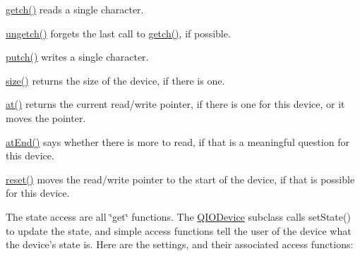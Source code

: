 \begin{DoxyItemize}
\item \hyperlink{class_q_i_o_device_a8fcd2eaee3ba67c6029f9e3e835bb7b1}{getch()} reads a single character.


\item \hyperlink{class_q_i_o_device_a8a5c37807d314cc04d65f1d0825c6e31}{ungetch()} forgets the last call to \hyperlink{class_q_i_o_device_a8fcd2eaee3ba67c6029f9e3e835bb7b1}{getch()}, if possible.


\item \hyperlink{class_q_i_o_device_a97247e4849c3038bde0e115215f5b995}{putch()} writes a single character.


\item \hyperlink{class_q_i_o_device_add26671f6640db9316df9922fef40b38}{size()} returns the size of the device, if there is one.


\item \hyperlink{class_q_i_o_device_a3bce8d0bb4d6fbaa012b9a61c3910907}{at()} returns the current read/write pointer, if there is one for this device, or it moves the pointer.


\item \hyperlink{class_q_i_o_device_a11cbf4ba82ee565cb9eef28b972bf145}{at\-End()} says whether there is more to read, if that is a meaningful question for this device.


\item \hyperlink{class_q_i_o_device_a50910ef42a65d4c139af341f1ef2323f}{reset()} moves the read/write pointer to the start of the device, if that is possible for this device.


\end{DoxyItemize}The state access are all \char`\"{}get\char`\"{} functions. The \hyperlink{class_q_i_o_device}{Q\-I\-O\-Device} subclass calls set\-State() to update the state, and simple access functions tell the user of the device what the device's state is. Here are the settings, and their associated access functions\-: 

